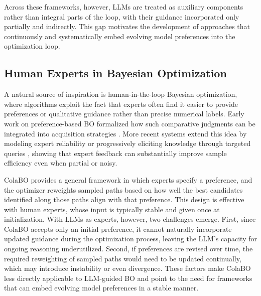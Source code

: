 \documentclass{article} %
\begin{document}
Across these frameworks, however, LLMs are treated as auxiliary components rather than integral parts of the loop, with their guidance incorporated only partially and indirectly. This gap motivates the development of approaches that continuously and systematically embed evolving model preferences into the optimization loop.

\subsection{Human Experts in Bayesian Optimization}

A natural source of inspiration is human-in-the-loop Bayesian optimization, where algorithms exploit the fact that experts often find it easier to provide preferences or qualitative guidance rather than precise numerical labels. Early work on preference-based BO formalized how such comparative judgments can be integrated into acquisition strategies \citep{Brochu2010tutorial,gonzalez2017preferential}. More recent systems extend this idea by modeling expert reliability \citep{Xu2024PrincipledCollabBO} or progressively eliciting knowledge through targeted queries \citep{Huang2022ActivelyElicitedExpert}, showing that expert feedback can substantially improve sample efficiency even when partial or noisy.

ColaBO \citep{Hvarfner2024ColaBO} provides a general framework in which experts specify a preference, and the optimizer reweights sampled paths based on how well the best candidates identified along those paths align with that preference. This design is effective with human experts, whose input is typically stable and given once at initialization. With LLMs as experts, however, two challenges emerge. First, since ColaBO accepts only an initial preference, it cannot naturally incorporate updated guidance during the optimization process, leaving the LLM’s capacity for ongoing reasoning underutilized. Second, if preferences are revised over time, the required reweighting of sampled paths would need to be updated continually, which may introduce instability or even divergence. These factors make ColaBO less directly applicable to LLM-guided BO and point to the need for frameworks that can embed evolving model preferences in a stable manner.


\end{document}
